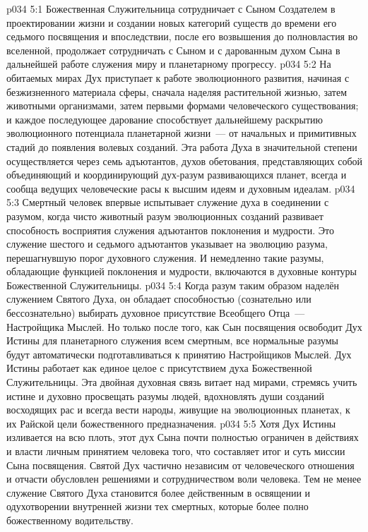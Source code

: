 \vs p034 5:1 Божественная Служительница сотрудничает с Сыном Создателем в проектировании жизни и создании новых категорий существ до времени его седьмого посвящения и впоследствии, после его возвышения до полновластия во вселенной, продолжает сотрудничать с Сыном и с дарованным духом Сына в дальнейшей работе служения миру и планетарному прогрессу.
\vs p034 5:2 На обитаемых мирах Дух приступает к работе эволюционного развития, начиная с безжизненного материала сферы, сначала наделяя растительной жизнью, затем животными организмами, затем первыми формами человеческого существования; и каждое последующее дарование способствует дальнейшему раскрытию эволюционного потенциала планетарной жизни~--- от начальных и примитивных стадий до появления волевых созданий. Эта работа Духа в значительной степени осуществляется через семь адъютантов, духов обетования, представляющих собой объединяющий и координирующий дух\hyp{}разум развивающихся планет, всегда и сообща ведущих человеческие расы к высшим идеям и духовным идеалам.
\vs p034 5:3 \pc Смертный человек впервые испытывает служение духа в соединении с разумом, когда чисто животный разум эволюционных созданий развивает способность восприятия служения адъютантов поклонения и мудрости. Это служение шестого и седьмого адъютантов указывает на эволюцию разума, перешагнувшую порог духовного служения. И немедленно такие разумы, обладающие функцией поклонения и мудрости, включаются в духовные контуры Божественной Служительницы.
\vs p034 5:4 Когда разум таким образом наделён служением Святого Духа, он обладает способностью (сознательно или бессознательно) выбирать духовное присутствие Всеобщего Отца~--- Настройщика Мыслей. Но только после того, как Сын посвящения освободит Дух Истины для планетарного служения всем смертным, все нормальные разумы будут автоматически подготавливаться к принятию Настройщиков Мыслей. Дух Истины работает как единое целое с присутствием духа Божественной Служительницы. Эта двойная духовная связь витает над мирами, стремясь учить истине и духовно просвещать разумы людей, вдохновлять души созданий восходящих рас и всегда вести народы, живущие на эволюционных планетах, к их Райской цели божественного предназначения.
\vs p034 5:5 Хотя Дух Истины изливается на всю плоть, этот дух Сына почти полностью ограничен в действиях и власти личным принятием человека того, что составляет итог и суть миссии Сына посвящения. Святой Дух частично независим от человеческого отношения и отчасти обусловлен решениями и сотрудничеством воли человека. Тем не менее служение Святого Духа становится более действенным в освящении и одухотворении внутренней жизни тех смертных, которые более полно  божественному водительству.
